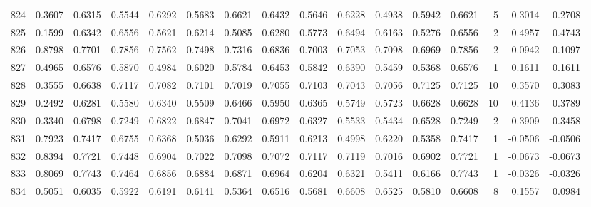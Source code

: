 \begin{tabular}{lrrrrrrrrrrrrrrr}
824 &      0.3607 &  0.6315 &  0.5544 &  0.6292 &  0.5683 &  0.6621 &  0.6432 &  0.5646 &  0.6228 &  0.4938 &   0.5942 &     0.6621 &      5 &                    0.3014 &                     0.2708 \\
825 &      0.1599 &  0.6342 &  0.6556 &  0.5621 &  0.6214 &  0.5085 &  0.6280 &  0.5773 &  0.6494 &  0.6163 &   0.5276 &     0.6556 &      2 &                    0.4957 &                     0.4743 \\
826 &      0.8798 &  0.7701 &  0.7856 &  0.7562 &  0.7498 &  0.7316 &  0.6836 &  0.7003 &  0.7053 &  0.7098 &   0.6969 &     0.7856 &      2 &                   -0.0942 &                    -0.1097 \\
827 &      0.4965 &  0.6576 &  0.5870 &  0.4984 &  0.6020 &  0.5784 &  0.6453 &  0.5842 &  0.6390 &  0.5459 &   0.5368 &     0.6576 &      1 &                    0.1611 &                     0.1611 \\
828 &      0.3555 &  0.6638 &  0.7117 &  0.7082 &  0.7101 &  0.7019 &  0.7055 &  0.7103 &  0.7043 &  0.7056 &   0.7125 &     0.7125 &     10 &                    0.3570 &                     0.3083 \\
829 &      0.2492 &  0.6281 &  0.5580 &  0.6340 &  0.5509 &  0.6466 &  0.5950 &  0.6365 &  0.5749 &  0.5723 &   0.6628 &     0.6628 &     10 &                    0.4136 &                     0.3789 \\
830 &      0.3340 &  0.6798 &  0.7249 &  0.6822 &  0.6847 &  0.7041 &  0.6972 &  0.6327 &  0.5533 &  0.5434 &   0.6528 &     0.7249 &      2 &                    0.3909 &                     0.3458 \\
831 &      0.7923 &  0.7417 &  0.6755 &  0.6368 &  0.5036 &  0.6292 &  0.5911 &  0.6213 &  0.4998 &  0.6220 &   0.5358 &     0.7417 &      1 &                   -0.0506 &                    -0.0506 \\
832 &      0.8394 &  0.7721 &  0.7448 &  0.6904 &  0.7022 &  0.7098 &  0.7072 &  0.7117 &  0.7119 &  0.7016 &   0.6902 &     0.7721 &      1 &                   -0.0673 &                    -0.0673 \\
833 &      0.8069 &  0.7743 &  0.7464 &  0.6856 &  0.6884 &  0.6871 &  0.6964 &  0.6204 &  0.6321 &  0.5411 &   0.6166 &     0.7743 &      1 &                   -0.0326 &                    -0.0326 \\
834 &      0.5051 &  0.6035 &  0.5922 &  0.6191 &  0.6141 &  0.5364 &  0.6516 &  0.5681 &  0.6608 &  0.6525 &   0.5810 &     0.6608 &      8 &                    0.1557 &                     0.0984 \\

\end{tabular}
